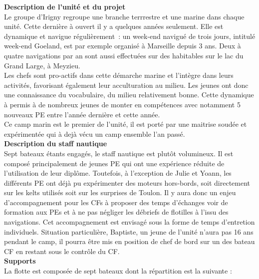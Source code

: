 \begin{minipage}[c][\textheight][t]{0.55\textwidth}
    \vspace{0.8cm}
    \color{StrongBlue}    
        {\huge \textbf{Description de l'unité et du projet}}\\
        Le groupe d’Irigny regroupe une branche terrrestre et une marine dans chaque unité. Cette dernière à ouvert il y a quelques années seulement. Elle est dynamique et navigue régulièrement~: un week-end navigué de trois jours, intitulé week-end Goeland, est par exemple organisé à Marseille depuis 3 ans. Deux à quatre navigations par an sont aussi effectuées sur des habitables sur le lac du Grand Large, à Meyzieu.\\
        Les chefs sont pro-actifs dans cette démarche marine et l'intègre dans leurs activités, favorisant également leur acculturation au milieu. Les jeunes ont donc une connaissance du vocabulaire, du milieu relativement bonne. Cette dynamique à permis à de nombreux jeunes de monter en compétences avec notamment 5 nouveaux PE entre l’année dernière et cette année.\\
        Ce camp marin est le premier de l'unité, il est porté par une maitrise soudée et expérimentée qui à dejà vécu un camp ensemble l'an passé. \vspace{0.4cm}\\
        {\huge \textbf{Description du staff nautique}}\\
        Sept bateaux étants engagés, le staff nautique est plutôt volumineux. Il est composé principalement de jeunes PE qui ont une expérience réduite de l'utilisation de leur diplôme.  
        Toutefois, à l'exception de Julie et Yoann, les différents PE ont déjà pu expérimenter des moteurs hors-bords, soit directement sur les kelts utilisés soit sur les surprises de Toulon. 
        Il y aura donc un enjeu d'accompagnement pour les CFs à proposer des temps d'échanges voir de formation aux PEs et à ne pas négliger les débriefs de flotilles à l'issu des navigations. Cet accompagnement est envisagé sous la forme de temps d'entretion individuels. 
        Situation particulière, Baptiste, un jeune de l'unité n'aura pas 16 ans pendant le camp, il pourra être mis en position de chef de bord sur un des bateau CF en restant sous le contrôle du CF.
            \vspace{0.4cm}\\
            { \huge \textbf{Supports}}\\
            La flotte est composée de sept bateaux dont la répartition est la suivante : \\

\end{minipage}
